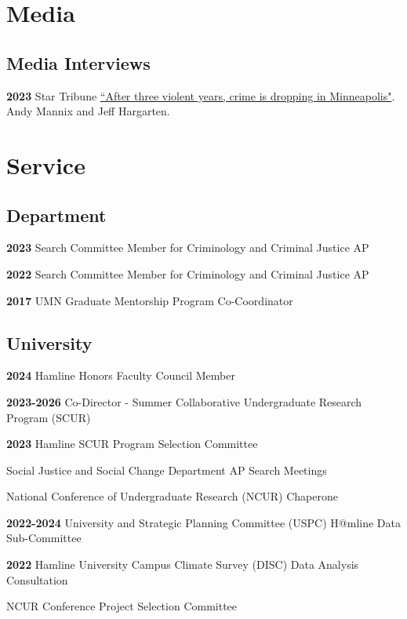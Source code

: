 \documentclass[letterpaper]{article}
\newenvironment{publist}{%
  \begin{list}{}{%
    \setlength{\leftmargin}{0cm}   %
    \setlength{\labelwidth}{2cm}     %
    \setlength{\labelsep}{0.5cm}     %
  }%
}{%
  \end{list}%
}
\begin{document}
\section*{\textbf{Media}}

\subsection*{Media Interviews}
\begin{publist}

\item[\textbf{2023}] Star Tribune \href{https://www.startribune.com/after-three-most-violent-years-minneapolis-saw-drop-in-crime-summer-but-were-not-back-to-normal-yet/600301635/}{``After three violent years, crime is dropping in Minneapolis"}. Andy Mannix and Jeff Hargarten.  

\end{publist}

\section*{\textbf{Service}}

\subsection*{Department}
\begin{publist}

\item[\textbf{2023}] Search Committee Member for Criminology and Criminal Justice AP
\item[\textbf{2022}] Search Committee Member for Criminology and Criminal Justice AP
\item[\textbf{2017}] UMN Graduate Mentorship Program Co-Coordinator

\end{publist}

\subsection*{University}
\begin{publist}
\item[\textbf{2024}] Hamline Honors Faculty Council Member
\item[\textbf{2023-2026}] Co-Director - Summer Collaborative Undergraduate Research Program (SCUR)
\item[\textbf{2023}] Hamline SCUR Program Selection Committee
\item Social Justice and Social Change Department AP Search Meetings
\item National Conference of Undergraduate Research (NCUR) Chaperone
\item[\textbf{2022-2024}]University and Strategic Planning Committee (USPC) H@mline Data Sub-Committee
\item[\textbf{2022}] Hamline University Campus Climate Survey (DISC) Data Analysis Consultation
\item NCUR Conference Project Selection Committee
\end{publist}
\end{document}
